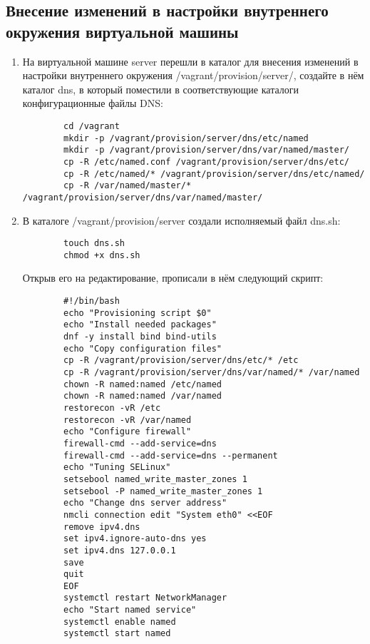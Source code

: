 \subsection{Внесение изменений в настройки внутреннего окружения виртуальной машины}
\begin{enumerate}
    \item На виртуальной машине server перешли в каталог для внесения изменений в настройки внутреннего окружения /vagrant/provision/server/, создайте в нём каталог dns, в который поместили в соответствующие каталоги конфигурационные файлы DNS:
        \begin{verbatim}
        cd /vagrant
        mkdir -p /vagrant/provision/server/dns/etc/named
        mkdir -p /vagrant/provision/server/dns/var/named/master/
        cp -R /etc/named.conf /vagrant/provision/server/dns/etc/
        cp -R /etc/named/* /vagrant/provision/server/dns/etc/named/
        cp -R /var/named/master/* /vagrant/provision/server/dns/var/named/master/
        \end{verbatim}
    \item В каталоге /vagrant/provision/server создали исполняемый файл dns.sh:
        \begin{verbatim}
        touch dns.sh
        chmod +x dns.sh
        \end{verbatim}
        Открыв его на редактирование, прописали в нём следующий скрипт:
        \begin{verbatim}
        #!/bin/bash
        echo "Provisioning script $0"
        echo "Install needed packages"
        dnf -y install bind bind-utils
        echo "Copy configuration files"
        cp -R /vagrant/provision/server/dns/etc/* /etc
        cp -R /vagrant/provision/server/dns/var/named/* /var/named
        chown -R named:named /etc/named
        chown -R named:named /var/named
        restorecon -vR /etc
        restorecon -vR /var/named
        echo "Configure firewall"
        firewall-cmd --add-service=dns
        firewall-cmd --add-service=dns --permanent
        echo "Tuning SELinux"
        setsebool named_write_master_zones 1
        setsebool -P named_write_master_zones 1
        echo "Change dns server address"
        nmcli connection edit "System eth0" <<EOF
        remove ipv4.dns
        set ipv4.ignore-auto-dns yes
        set ipv4.dns 127.0.0.1
        save
        quit
        EOF
        systemctl restart NetworkManager
        echo "Start named service"
        systemctl enable named
        systemctl start named
        \end{verbatim}

\end{enumerate}
